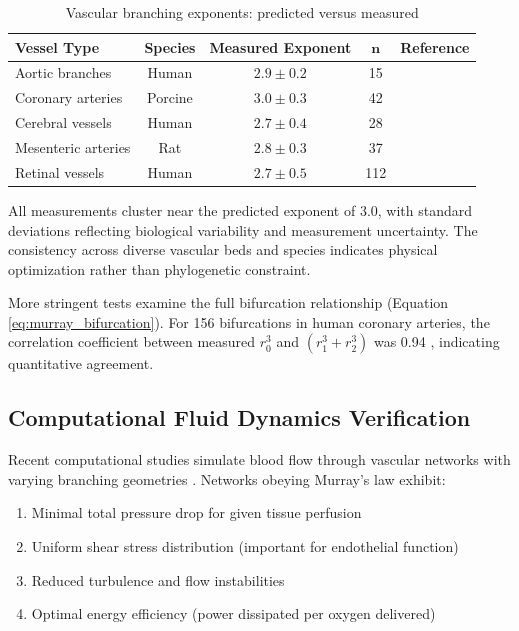 \documentclass[10pt,twocolumn,a4paper]{article}
\theoremstyle{remark}
\begin{document}
\begin{table}[h]
\centering
\caption{Vascular branching exponents: predicted versus measured}
\label{tab:murray_validation}
\begin{tabular}{lcccc}
\toprule
\textbf{Vessel Type} & \textbf{Species} & \textbf{Measured Exponent} & \textbf{$\boldsymbol{n}$} & \textbf{Reference} \\
\midrule
Aortic branches & Human & $2.9 \pm 0.2$ & 15 & \cite{zamir1976optimality} \\
Coronary arteries & Porcine & $3.0 \pm 0.3$ & 42 & \cite{kassab1997scaling} \\
Cerebral vessels & Human & $2.7 \pm 0.4$ & 28 & \cite{rossitti1995optimal} \\
Mesenteric arteries & Rat & $2.8 \pm 0.3$ & 37 & \cite{suwa1963estimation} \\
Retinal vessels & Human & $2.7 \pm 0.5$ & 112 & \cite{chapman1996blood} \\
\bottomrule
\end{tabular}
\end{table}

All measurements cluster near the predicted exponent of 3.0, with standard deviations reflecting biological variability and measurement uncertainty. The consistency across diverse vascular beds and species indicates physical optimization rather than phylogenetic constraint.

More stringent tests examine the full bifurcation relationship (Equation \ref{eq:murray_bifurcation}). For 156 bifurcations in human coronary arteries, the correlation coefficient between measured $r_{0}^{3}$ and $(r_{1}^{3} + r_{2}^{3})$ was 0.94 \cite{kassab1997scaling}, indicating quantitative agreement.

\subsection{Computational Fluid Dynamics Verification}

Recent computational studies simulate blood flow through vascular networks with varying branching geometries \cite{huo2008intraspecific}. Networks obeying Murray's law exhibit:

\begin{enumerate}
\item Minimal total pressure drop for given tissue perfusion
\item Uniform shear stress distribution (important for endothelial function)
\item Reduced turbulence and flow instabilities
\item Optimal energy efficiency (power dissipated per oxygen delivered)
\end{enumerate}
\end{document}
